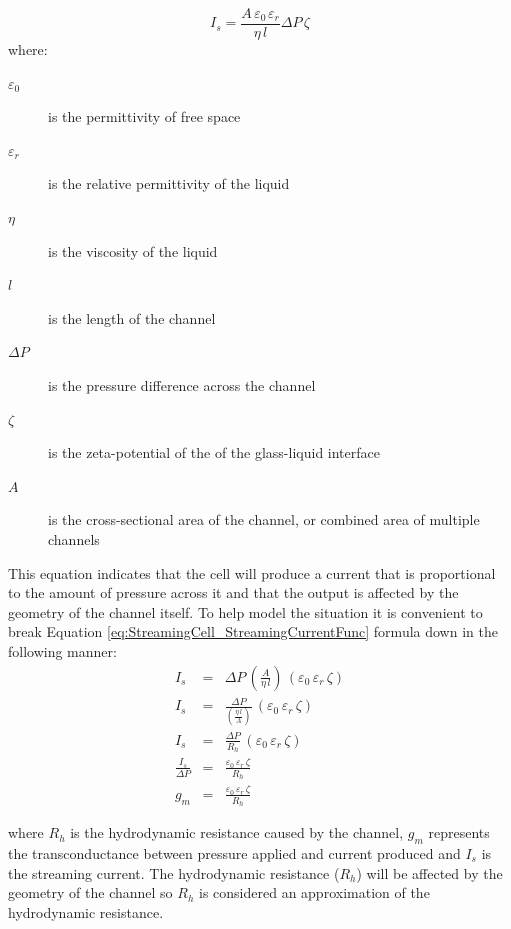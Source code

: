 \begin{equation} I_{s}=\frac{A\,\varepsilon_{0\,}\varepsilon_{r}}{\eta\,
        l}\Delta P\,\zeta\label{eq:StreamingCell_StreamingCurrentFunc}
\end{equation} where: \begin{description} \item [{$\varepsilon_{0}$}] is the
        permittivity of free space \item [{$\varepsilon_{r}$}] is the relative
        permittivity of the liquid \item [{$\eta$}] is the viscosity of the
        liquid \item [{$l$}] is the length of the channel \item [{$\Delta P$}]
        is the pressure difference across the channel \item [{$\zeta$}] is the
        zeta-potential of the of the glass-liquid interface \item [{$A$}] is
        the cross-sectional area of the channel, or combined area of multiple
        channels \end{description} This equation indicates that the cell will
produce a current that is proportional to the amount of pressure across it and
that the output is affected by the geometry of the channel itself. To help
model the situation it is convenient to break Equation
\ref{eq:StreamingCell_StreamingCurrentFunc} formula down in the following
manner: \begin{eqnarray} I_{s} & = & \Delta P\,\left(\frac{A}{\eta\,
            l}\right)\,\left(\varepsilon_{0}\,\varepsilon_{r}\,\zeta\right)\nonumber
    \\ I_{s} & = & \frac{\Delta P}{\left(\frac{\eta\,
                l}{A}\right)}\,\left(\varepsilon_{0}\,\varepsilon_{r}\,\zeta\right)\nonumber
    \\ I_{s} & = & \frac{\Delta
        P}{R_{h}}\,\left(\varepsilon_{0}\,\varepsilon_{r}\,\zeta\right)\label{eq:StreamingCurrent_HydrostaticResistance}\\
    \frac{I_{s}}{\Delta P} & = &
    \frac{\varepsilon_{0}\,\varepsilon_{r}\,\zeta}{R_{h}}\nonumber \\ g_{m} & =
    & \frac{\varepsilon_{0}\,\varepsilon_{r}\,\zeta}{R_{h}}\nonumber
\end{eqnarray}


where $R_{h}$ is the hydrodynamic resistance caused by the channel, $g_{m}$
represents the transconductance between pressure applied and current produced
and $I_{s}$ is the streaming current. The hydrodynamic resistance ($R_{h}$)
will be affected by the geometry of the channel so $R_{h}$ is considered an
approximation of the hydrodynamic resistance.


